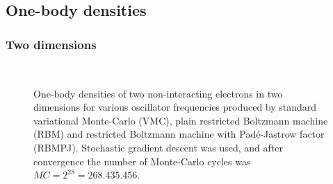 \subsection{One-body densities}
\subsubsection{Two dimensions}

\begin{figure} [H]%
	\centering
	\\
	
	\caption{One-body densities of two non-interacting electrons in two dimensions for various oscillator frequencies produced by standard variational Monte-Carlo (VMC), plain restricted Boltzmann machine (RBM) and restricted Boltzmann machine with Padé-Jastrow factor (RBMPJ). Stochastic gradient descent was used, and after convergence the number of Monte-Carlo cycles was $MC=2^{28}=268.435.456$.}%
	\label{fig:OB_interaction_2P_2D}
\end{figure}

